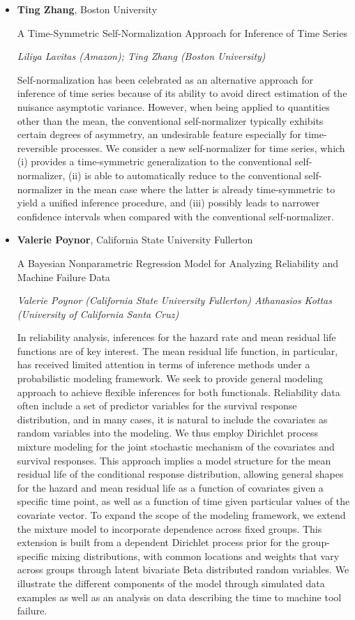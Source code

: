 \begin{itemize}
\item \textbf{Ting Zhang}, Boston University

A Time-Symmetric Self-Normalization Approach for Inference of Time Series

\emph{\footnotesize Liliya Lavitas (Amazon); Ting Zhang (Boston University)}

Self-normalization has been celebrated as an alternative approach for inference of time series because of its ability to avoid direct estimation of the nuisance asymptotic variance. However, when being applied to quantities other than the mean, the conventional self-normalizer typically exhibits certain degrees of asymmetry, an undesirable feature especially for time-reversible processes. We consider a new self-normalizer for time series, which (i) provides a time-symmetric generalization to the conventional self-normalizer, (ii) is able to automatically reduce to the conventional self-normalizer in the mean case where the latter is already time-symmetric to yield a unified inference procedure, and (iii) possibly leads to narrower confidence intervals when compared with the conventional self-normalizer.

\item \textbf{Valerie Poynor}, California State University Fullerton

A Bayesian Nonparametric Regression Model for Analyzing Reliability and Machine Failure Data

\emph{\footnotesize Valerie Poynor (California State University Fullerton) Athanasios Kottas (University of California Santa Cruz)}

In reliability analysis, inferences for the hazard rate and mean residual life functions are of key interest.  The mean residual life function, in particular, has received limited attention in terms of inference methods under a probabilistic modeling framework.  We seek to provide general modeling approach to achieve flexible inferences for both functionals. Reliability data often include a set of predictor variables for the survival response distribution, and in many cases, it is natural to include the covariates as random variables into the modeling. We thus employ Dirichlet process mixture modeling for the joint stochastic mechanism of the covariates and survival responses. This approach implies a model structure for the mean residual life of the conditional response distribution, allowing general shapes for the hazard and mean residual life as a function of covariates given a specific time point, as well as a function of time given particular values of the covariate vector. To expand the scope of the modeling framework, we extend the mixture model to incorporate dependence across fixed groups. This extension is built from a dependent Dirichlet process prior for the group-specific mixing distributions, with common locations and weights that vary across groups through latent bivariate Beta distributed random variables.  We illustrate the different components of the model through simulated data examples as well as an analysis on data describing the time to machine tool failure.


\end{itemize}

